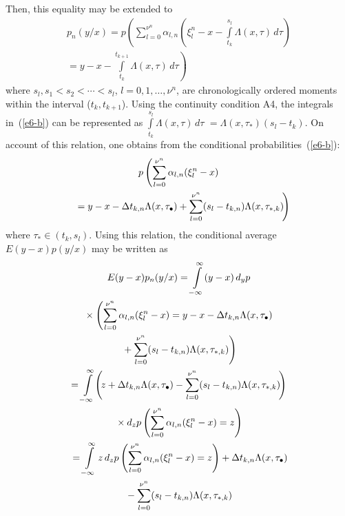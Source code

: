 \begin{multicols}{2}
Then, this equality may be extended to
\begin{multline}
p_{n} (y/x)=p\left(\sum\limits_{l=0}^{\nu ^{n} }\alpha_{l,n}  \left(\xi_{l}^{n} -
x-\int\limits_{t_{k} }^{s_{l} }\Lambda (x,\tau )\,d\tau \right)\right.\\
\left.{}=
y-x-\int\limits_{t_{k} }^{t_{k+1} }\Lambda (x,\tau )\,d\tau \right) 
\label{e6-b}
\end{multline}
where $s_{l} ,s_{1} <s_{2} <\cdots<s_{l}$, $l=0,1,\ldots ,\nu ^{n}$, 
are chronologically ordered moments within the interval ($t_{k} ,t_{k+1} $). 
Using the continuity condition A4, the integrals in~(\ref{e6-b}) can be represented as 
$\int\limits_{t_{k} }^{s_{l} }\Lambda (x,\tau )\,d\tau$\linebreak 
$ =\Lambda (x,\tau_{*} )(s_{l} -t_{k} )$. 
 On account of this relation, one obtains from the 
conditional probabilities~(\ref{e6-b}):
\begin{multline*}
p\left(\sum\limits_{l=0}^{\nu ^{n} }\alpha_{l,n}  (\xi_{l}^{n} -x)\right.\\
\left.{}=
y-x-\Delta t_{k,n} \Lambda (x,\tau_{\bullet } )+
\sum\limits_{l=0}^{\nu ^{n} }(s_{l} -t_{k,n}  )\Lambda (x,\tau_{*,k} )\!\right)\hspace*{-5.64505pt}
\end{multline*}
where $\tau_{*} \in (t_{k} ,s_{l} )$.
Using this relation, the conditional average $E(y-x)p(y/x)$ may be written as
\begin{multline}
E(y-x)p_{n} (y/x)  =\int\limits_{-\infty }^{\infty }(y-x)\,d_{y} p\\
{}\times \left(\sum\limits_{l=0}^{\nu ^{n} }\alpha_{l,n}  
(\xi_{l}^{n} -x)=y-x-\Delta t_{k,n} \Lambda (x,\tau_{\bullet } )\right.\\
\left.{}+\sum\limits_{l=0}^{\nu ^{n} }(s_{l} -t_{k,n}  )\Lambda (x,\tau_{*,k} )\right)\\ =
\int\limits_{-\infty }^{\infty }\!\left(\!
\vphantom{\sum\limits_{l=0}^{v^n}}
z+ \Delta t_{k,n} \Lambda (x,\tau_{\bullet } )
- 
\sum\limits_{l=0}^{\nu ^{n} }(s_{l} -t_{k,n}  )\Lambda (x,\tau_{*,k} )\!\right)\\
{}\times d_{z} p 
\left(\sum\limits_{l=0}^{\nu ^{n} }\alpha_{l,n}  (\xi_{l}^{n} -x)=z\right)  \\
{}=\int\limits_{-\infty }^{\infty }z\,d_{z} 
p\left(\sum\limits_{l=0}^{\nu ^{n} }\alpha_{l,n}  (\xi_{l}^{n} -x)=z\right)+\Delta t_{k,n} 
\Lambda (x,\tau_{\bullet } ) \\
{}-
\sum\limits_{l=0}^{\nu ^{n} }(s_{l} -t_{k,n}  )\Lambda (x,\tau_{*,k} )

\end{multline}
\end{multicols}
